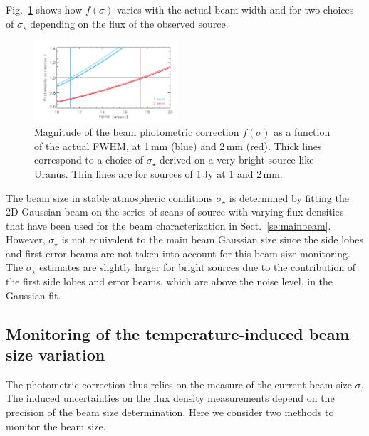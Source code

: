 \documentclass[traditionalabstract]{aa}
\begin{document}
\begin{appendix}
Fig.~\ref{fig:f_sigma} shows how $f(\sigma)$ varies with the actual beam width
and for two choices of $\sigma_\star$ depending on the flux of the observed source.

\begin{figure}[ht!]
  \begin{center}
    \includegraphics[clip=true, trim={0.9cm, 0.1cm, 0.5cm, 0.5cm}, width=0.4725\textwidth]{Figures/photometric_correction_function_1Jy.pdf}
    \caption[Photometric correction]{Magnitude of the beam photometric
      correction $f(\sigma)$ as a function of the actual FWHM, at 1\,mm (blue)
      and 2\,mm (red). Thick lines correspond to a choice of $\sigma_\star$
      derived on a very bright source like Uranus. Thin lines are for sources of
      1\,Jy at 1 and 2\,mm.}
\label{fig:f_sigma}
\end{center}
\end{figure}


The beam size in stable atmospheric conditions $\sigma_\star$ is
determined by fitting the 2D Gaussian beam on the series of scans of
source with varying flux densities that have been used for the beam
characterization in Sect.~\ref{se:mainbeam}. However, $\sigma_\star$
is not equivalent to the main beam Gaussian size since the side lobes
and first error beams are not taken into account for this beam size
monitoring. The $\sigma_\star$ estimates are slightly
larger for bright sources due to the contribution of the first side
lobes and error beams, which are above the noise level, in the Gaussian fit.


\subsection{Monitoring of the temperature-induced beam size variation}
\label{ap:beam_monitoring}

The photometric correction thus relies on the measure of the current beam size
$\sigma$. The induced uncertainties on the flux density measurements depend on
the precision of the beam size determination. Here we
consider two methods to monitor the beam size.


\end{appendix}
\end{document}
